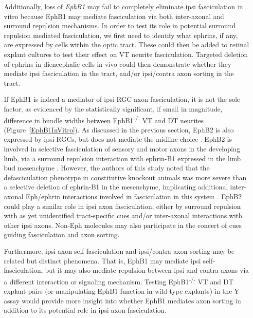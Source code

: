 Additionally, loss of \emph{EphB1} may fail to completely eliminate ipsi fasciculation in vitro because EphB1 may mediate fasciculation via both inter-axonal and surround repulsion mechanisms.
In order to test its role in potential surround repulsion mediated fasciculation, we first need to identify what ephrins, if any, are expressed by cells within the optic tract.
These could then be added to retinal explant cultures to test their effect on VT neurite fasciculation.
Targeted deletion of ephrins in diencephalic cells in vivo could then demonstrate whether they mediate ipsi fasciculation in the tract, and/or ipsi/contra axon sorting in the tract.

If EphB1 is indeed a mediator of ipsi RGC axon fasciculation, it is not the sole factor, as evidenced by the statistically significant, if small in magnitude, difference in bundle widths between EphB1\textsuperscript{-/-} VT and DT neurites (Figure~\ref{EphB1InVitro}).
As discussed in the previous section, EphB2 is also expressed by ipsi RGCs, but does not mediate the midline choice \cite{williams2003ephrin,chenaux2011forward}.
EphB2 is involved in selective fasciculation of sensory and motor axons in the developing limb, via a surround repulsion interaction with ephrin-B1 expressed in the limb bud mesenchyme \cite{luxey2013eph}.
However, the authors of this study noted that the defasciculation phenotype in constitutive knockout animals was more severe than a selective deletion of ephrin-B1 in the mesenchyme, implicating additional inter-axonal Eph/ephrin interactions involved in fasciculation in this system \cite{luxey2013eph}.
EphB2 could play a similar role in ipsi axon fasciculation, either by surround repulsion with as yet unidentified tract-specific cues and/or inter-axonal interactions with other ipsi axons.
Non-Eph molecules may also participate in the concert of cues guiding fasciculation and axon sorting.

Furthermore, ipsi axon self-fasciculation and ipsi/contra axon sorting may be related but distinct phenomena.
That is, EphB1 may mediate ipsi self-fasciculation, but it may also mediate repulsion between ipsi and contra axons via a different interaction or signaling mechanism.
Testing EphB1\textsuperscript{-/-} VT and DT explant pairs (or manipulating EphB1 function in wild-type explants) in the Y assay would provide more insight into whether EphB1 mediates axon sorting in addition to its potential role in ipsi axon fasciculation.